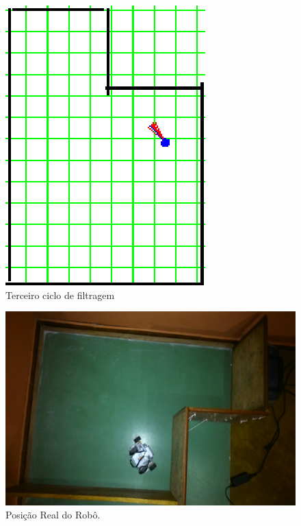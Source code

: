 \begin{figure}[H]
  \centering
  \includegraphics[scale=1]{figuras/cen1_ex5/4.eps}
  \caption[Terceiro Ciclo de Filtragem]{Terceiro ciclo de filtragem}
  \label{img:cen1_ex5_4}
\end{figure}

\begin{figure}[H]
  \centering
  \includegraphics[scale=0.8]{figuras/cen1_ex5/real.eps}
  \caption[Posição real do Robô]{Posição Real do Robô.}
  \label{img:cen1_ex5_6}
\end{figure}

